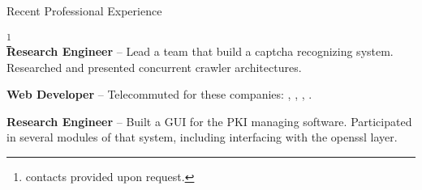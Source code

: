 \begin{rubric}{Recent Professional Experience}{
  \footnote{contacts provided upon request.}  \\
  
  \entry*[2010 - Present] \textbf{Research Engineer} -- Lead a team
  that build a captcha recognizing system. Researched and presented
  concurrent crawler architectures.

  \entry*[2007-2009] \textbf{Web Developer} -- Telecommuted for these companies:
  ,
  ,
  ,
  .

  \entry*[2005 - 2007] \textbf{Research Engineer} -- 
  Built a GUI for the PKI managing software. Participated in several modules of that system, including interfacing with the openssl layer.

}\end{rubric}

